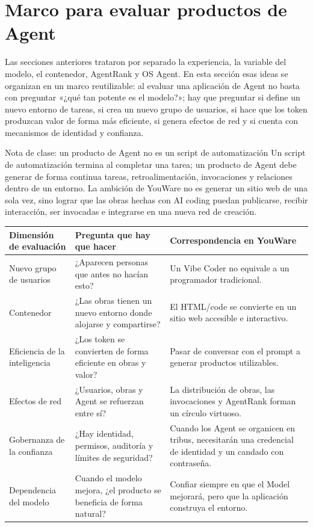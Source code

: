 \section{Marco para evaluar productos de Agent}

Las secciones anteriores trataron por separado la experiencia, la variable del modelo, el contenedor, AgentRank y OS Agent. En esta sección esas ideas se organizan en un marco reutilizable: al evaluar una aplicación de Agent no basta con preguntar «¿qué tan potente es el modelo?»; hay que preguntar si define un nuevo entorno de tareas, si crea un nuevo grupo de usuarios, si hace que los token produzcan valor de forma más eficiente, si genera efectos de red y si cuenta con mecanismos de identidad y confianza.

\begin{knowledgebox}{Nota de clase: un producto de Agent no es un script de automatización}
Un script de automatización termina al completar una tarea; un producto de Agent debe generar de forma continua tareas, retroalimentación, invocaciones y relaciones dentro de un entorno. La ambición de YouWare no es generar un sitio web de una sola vez, sino lograr que las obras hechas con AI coding puedan publicarse, recibir interacción, ser invocadas e integrarse en una nueva red de creación.
\end{knowledgebox}

\noindent\begin{tabularx}{\textwidth}{p{}p{}X}
\toprule
Dimensión de evaluación & Pregunta que hay que hacer & Correspondencia en YouWare \\
\midrule
Nuevo grupo de usuarios & ¿Aparecen personas que antes no hacían esto? & Un Vibe Coder no equivale a un programador tradicional. \\
Contenedor & ¿Las obras tienen un nuevo entorno donde alojarse y compartirse? & El HTML/code se convierte en un sitio web accesible e interactivo. \\
Eficiencia de la inteligencia & ¿Los token se convierten de forma eficiente en obras y valor? & Pasar de conversar con el prompt a generar productos utilizables. \\
Efectos de red & ¿Usuarios, obras y Agent se refuerzan entre sí? & La distribución de obras, las invocaciones y AgentRank forman un círculo virtuoso. \\
Gobernanza de la confianza & ¿Hay identidad, permisos, auditoría y límites de seguridad? & Cuando los Agent se organicen en tribus, necesitarán una credencial de identidad y un candado con contraseña. \\
Dependencia del modelo & Cuando el modelo mejora, ¿el producto se beneficia de forma natural? & Confiar siempre en que el Model mejorará, pero que la aplicación construya el entorno. \\
\bottomrule
\end{tabularx}

